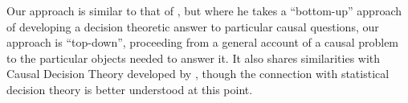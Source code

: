 Our approach is similar to that of \cite{dawid_decision-theoretic_2012}, but where he takes a ``bottom-up'' approach of developing a decision theoretic answer to particular causal questions, our approach is ``top-down'', proceeding from a general account of a causal problem to the particular objects needed to answer it. It also shares similarities with Causal Decision Theory developed by \cite{lewis_causal_1981}, though the connection with statistical decision theory is better understood at this point.




